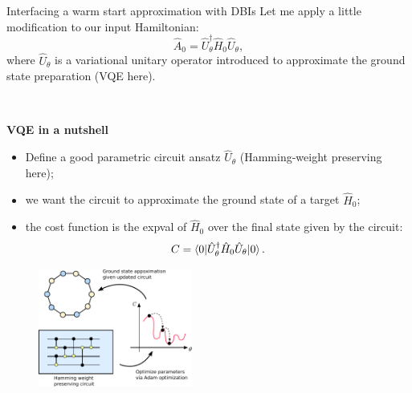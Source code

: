 \documentclass[aspectratio=169, 8pt, xcolor={svgnames}]{beamer}
\begin{document}
\begin{frame}{Interfacing a warm start approximation with DBIs}
Let me apply a little modification to our input Hamiltonian:
$$ \hat{A}_0 = \hat{U}_{\theta}^{\dagger} \hat{H}_0 \hat{U}_{\theta}, $$
where $\hat{U}_{\theta}$ is a variational unitary operator introduced to approximate 
the ground state preparation (VQE here).
\begin{multicols}{2}
\vspace{1cm}
\texttt{  }

\textbf{VQE in a nutshell}
\begin{itemize}[noitemsep]
\item[1.] Define a good parametric circuit ansatz $\hat{U}_{\theta}$ (Hamming-weight preserving here);
\item[2.] we want the circuit to approximate the ground state of a target $\hat{H}_0$;
\item[3.] the cost function is the expval of $\hat{H}_0$ over the 
final state given by the circuit:
$$ C = \braket{0 | \hat{U}_{\theta}^{\dagger} \hat{H}_0  \hat{U}_{\theta} | 0}.$$
\end{itemize}
\begin{figure}
   \includegraphics[width=0.45\textwidth]{figures/vqe_hw.pdf}
\end{figure}
\end{multicols}
\end{frame}
\end{document}
